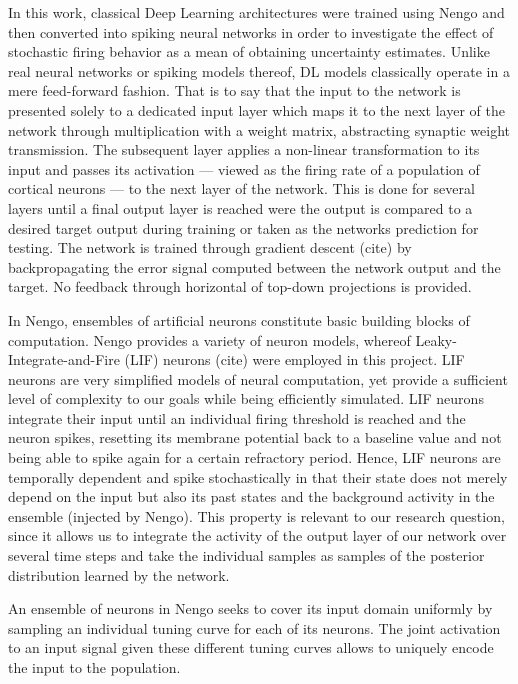 \documentclass[10pt,a4paper,twocolumn]{article}
\begin{document}
In this work, classical Deep Learning architectures were trained using Nengo and then converted into spiking neural networks in order to investigate the effect of stochastic firing behavior as a mean of obtaining uncertainty estimates. Unlike real neural networks or spiking models thereof, DL models classically operate in a mere feed-forward fashion. That is to say that the input to the network is presented solely to a dedicated input layer which maps it to the next layer of the network through multiplication with a weight matrix, abstracting synaptic weight transmission. The subsequent layer applies a non-linear transformation to its input and passes its activation --- viewed as the firing rate of a population of cortical neurons  --- to the next layer of the network. This is done for several layers until a final output layer is reached were the output is compared to a desired target output during training or taken as the networks prediction for testing. The network is trained through gradient descent (cite) by backpropagating the error signal computed between the network output and the target. No feedback through horizontal of top-down projections is provided.

In Nengo, ensembles of artificial neurons constitute basic building blocks of computation. Nengo provides a variety of neuron models, whereof Leaky-Integrate-and-Fire (LIF) neurons (cite) were employed in this project. LIF neurons are very simplified models of neural computation, yet provide a sufficient level of complexity to our goals while being efficiently simulated. LIF neurons integrate their input until an individual firing threshold is reached and the neuron spikes, resetting its membrane potential back to a baseline value and not being able to spike again for a certain refractory period. Hence, LIF neurons are temporally dependent and spike stochastically in that their state does not merely depend on the input but also its past states and the background activity in the ensemble (injected by Nengo). This property is relevant to our research question, since it allows us to integrate the activity of the output layer of our network over several time steps and take the individual samples as samples of the posterior distribution learned by the network. 

An ensemble of neurons in Nengo seeks to cover its input domain uniformly by sampling an individual tuning curve for each of its neurons. The joint activation to an input signal given these different tuning curves allows to uniquely encode the input to the population.  
\end{document}
